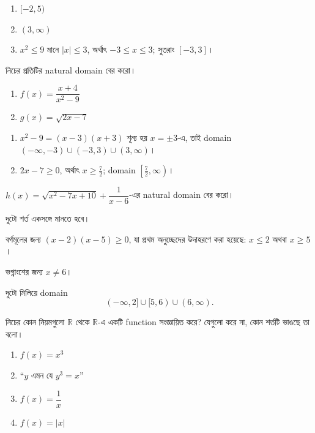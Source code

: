 \documentclass[11pt]{article}
\begin{document}
\begin{sol}
\begin{enumerate}
  \item $[-2, 5)$
  \item $(3, \infty)$
  \item $x^2 \leq 9$ মানে $|x| \leq 3$, অর্থাৎ $-3 \leq x \leq 3$; সুতরাং
        $[-3, 3]$।
\end{enumerate}
\end{sol}

 নিচের প্রতিটির natural domain বের করো।
\begin{enumerate}
  \item $f(x) = \dfrac{x + 4}{x^2 - 9}$
  \item $g(x) = \sqrt{2x - 7}$
\end{enumerate}

\begin{sol}
\begin{enumerate}
  \item $x^2 - 9 = (x-3)(x+3)$ শূন্য হয় $x = \pm 3$-এ, তাই domain
        $(-\infty, -3) \cup (-3, 3) \cup (3, \infty)$।
  \item $2x - 7 \geq 0$, অর্থাৎ $x \geq \tfrac{7}{2}$; domain
        $\left[\tfrac{7}{2}, \infty\right)$।
\end{enumerate}
\end{sol}

 $h(x) = \sqrt{x^2 - 7x + 10} + \dfrac{1}{x - 6}$-এর natural domain
বের করো।

\begin{sol}
দুটো শর্ত একসঙ্গে মানতে হবে।

বর্গমূলের জন্য $(x-2)(x-5) \geq 0$, যা প্রথম অনুচ্ছেদের উদাহরণে করা হয়েছে:
$x \leq 2$ অথবা $x \geq 5$।

ভগ্নাংশের জন্য $x \neq 6$।

দুটো মিলিয়ে domain
\[
  (-\infty, 2] \cup [5, 6) \cup (6, \infty).
\]
\end{sol}

 নিচের কোন নিয়মগুলো $\mathbb{R}$ থেকে $\mathbb{R}$-এ একটি function
সংজ্ঞায়িত করে? যেগুলো করে না, কোন শর্তটি ভাঙছে তা বলো।
\begin{enumerate}
  \item $f(x) = x^3$
  \item ``$y$ এমন যে $y^3 = x$''
  \item $f(x) = \dfrac{1}{x}$
  \item $f(x) = |x|$
\end{enumerate}
\end{document}

